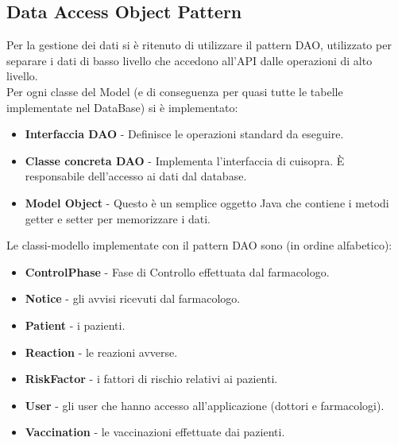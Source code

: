 \documentclass{article}
\begin{document}
\subsection{Data Access Object Pattern}
Per la gestione dei dati si è ritenuto di utilizzare il pattern DAO, utilizzato per separare i dati di basso livello che accedono all'API dalle operazioni di alto livello.\\
Per ogni classe del Model (e di conseguenza per quasi tutte le tabelle implementate nel DataBase) si è implementato:
\begin{itemize}
    \item \textbf{Interfaccia DAO} - Definisce le operazioni standard da eseguire.
    \item \textbf{Classe concreta DAO} - Implementa l'interfaccia di cuisopra. È responsabile dell'accesso ai dati dal database.
    \item \textbf{Model Object} - Questo è un semplice oggetto Java che contiene i metodi getter e setter per memorizzare i dati.
\end{itemize}
Le classi-modello implementate con il pattern DAO sono (in ordine alfabetico):
\begin{itemize}
    \item \textbf{ControlPhase} - Fase di Controllo effettuata dal farmacologo.
    \item \textbf{Notice} - gli avvisi ricevuti dal farmacologo.
    \item \textbf{Patient} - i pazienti.
    \item \textbf{Reaction} - le reazioni avverse.
    \item \textbf{RiskFactor} - i fattori di rischio relativi ai pazienti.
    \item \textbf{User} - gli user che hanno accesso all'applicazione (dottori e farmacologi).
    \item \textbf{Vaccination} - le vaccinazioni effettuate dai pazienti.
\end{itemize}

\newpage
\end{document}

